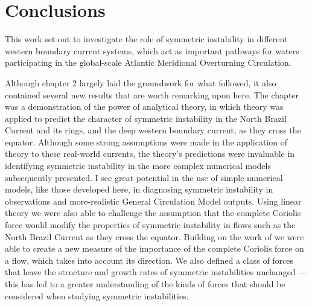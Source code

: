 \chapter{Conclusions}

This work set out to investigate the role of symmetric instability in different western boundary current systems, which act as important pathways for waters participating in the global-scale Atlantic Meridional Overturning Circulation. 

Although chapter 2 largely laid the groundwork for what followed, it also contained several new results that are worth remarking upon here. The chapter was a demonstration of the power of analytical theory, in which theory was applied to predict the character of symmetric instability in the North Brazil Current and its rings, and the deep western boundary current, as they cross the equator. Although some strong assumptions were made in the application of theory to these real-world currents, the theory's predictions were invaluable in identifying symmetric instability in the more complex numerical models subsequently presented. I see great potential in the use of simple numerical models, like those developed here, in diagnosing symmetric instability in observations and more-realistic General Circulation Model outputs. Using linear theory we were also able to challenge the assumption that the complete Coriolis force would modify the properties of symmetric instability in flows such as the North Brazil Current as they cross the equator. Building on the work of \citet{Zeitlin2018a} we were able to create a new measure of the importance of the complete Coriolis force on a flow, which takes into account its direction. We also defined a class of forces that leave the structure and growth rates of symmetric instabilities unchanged --- this has led to a greater understanding of the kinds of forces that should be considered when studying symmetric instabilities.

